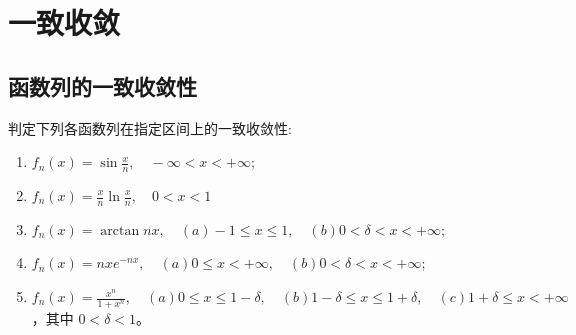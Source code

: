 \chapter{一致收敛}
\section{函数列的一致收敛性}
\begin{problem}
    判定下列各函数列在指定区间上的一致收敛性:
    \begin{enumerate}
        \item \(f_n(x) = \sin \frac{x}{n}, \quad -\infty <
            x < +\infty\);
        \item \(f_n(x) = \frac{x}{n} \ln \frac{x}{n}, \quad
            0 < x < 1\)
        \item \(f_n(x) = \arctan nx, \quad (a) - 1 \leq x
                \leq 1, \quad (b) 0 <
            \delta < x < +\infty\);
        \item \(f_n(x) = nxe^{-nx}, \quad (a) 0 \leq x <
                +\infty, \quad (b) 0 <
            \delta < x < +\infty\);
        \item \(f_n(x) = \frac{x^n}{1 + x^n}, \quad (a) 0
                \leq x \leq 1 -
                \delta, \quad (b) 1 - \delta \leq x \leq 1 + \delta,
            \quad (c) 1 + \delta \leq x < +\infty\)，其中 \(0 <
            \delta < 1\)。
    \end{enumerate}
\end{problem}

